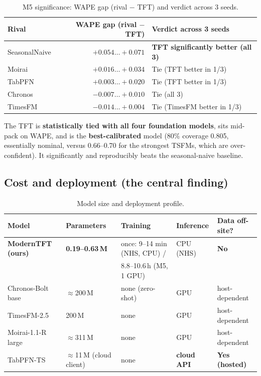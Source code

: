 \documentclass[11pt]{article}
\begin{document}
\begin{table}[h]
\centering
\caption{M5 significance: WAPE gap (rival $-$ TFT) and verdict across 3 seeds.}
\begin{tabular}{lrl}
\toprule
Rival & WAPE gap (rival $-$ TFT) & Verdict across 3 seeds \\
\midrule
SeasonalNaive & $+0.054 \ldots +0.071$ & \textbf{TFT significantly better (all 3)} \\
Moirai  & $+0.016 \ldots +0.034$ & Tie (TFT better in 1/3) \\
TabPFN  & $+0.003 \ldots +0.020$ & Tie (TFT better in 1/3) \\
Chronos & $-0.007 \ldots +0.010$ & Tie (all 3) \\
TimesFM & $-0.014 \ldots +0.004$ & Tie (TimesFM better in 1/3) \\
\bottomrule
\end{tabular}
\end{table}

\noindent The TFT is \textbf{statistically tied with all four foundation models}, sits
mid-pack on WAPE, and is the \textbf{best-calibrated} model (80\% coverage 0.805,
essentially nominal, versus 0.66--0.70 for the strongest TSFMs, which are over-confident). It
significantly and reproducibly beats the seasonal-naive baseline.

\subsection{Cost and deployment (the central finding)}
\begin{table}[h]
\centering
\caption{Model size and deployment profile.}
\begin{tabular}{lllll}
\toprule
Model & Parameters & Training & Inference & Data off-site? \\
\midrule
\textbf{ModernTFT (ours)} & \textbf{0.19--0.63\,M} & once: 9--14 min (NHS, CPU) / & CPU (NHS) & \textbf{No} \\
 & & 8.8--10.6\,h (M5, 1 GPU) & & \\
Chronos-Bolt base & $\approx$200\,M & none (zero-shot) & GPU & host-dependent \\
TimesFM-2.5 & 200\,M & none & GPU & host-dependent \\
Moirai-1.1-R large & $\approx$311\,M & none & GPU & host-dependent \\
TabPFN-TS & $\approx$11\,M (cloud client) & none & \textbf{cloud API} & \textbf{Yes (hosted)} \\
\bottomrule
\end{tabular}
\end{table}
\end{document}

